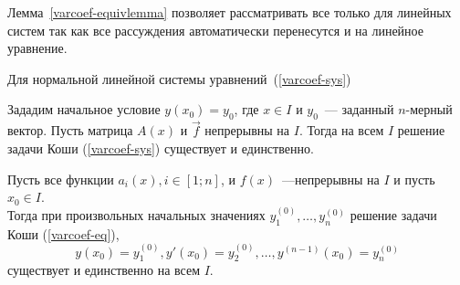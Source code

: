 Лемма~\ref{varcoef-equivlemma} позволяет рассматривать все только для линейных систем так как все рассуждения автоматически перенесутся и на линейное уравнение.

Для нормальной линейной системы уравнений~(\ref{varcoef-sys})

\begin{theorem}
Зададим начальное условие \(y(x_0) = y_0\), где \(x \in I\) и $y_0$~--- заданный $n$-мерный вектор. Пусть матрица $A(x)$ и $\vec{f}$ непрерывны на $I$. Тогда на всем $I$ решение задачи Коши (\ref{varcoef-sys}) существует и единственно.
\end{theorem}

\begin{theorem}
Пусть все функции \(a_i(x), i \in [1; n]\), и \(f(x)\)~---непрерывны на $I$ и пусть \(x_0 \in I\).\\
Тогда при произвольных начальных значениях \(y_1^{(0)}, \ldots, y_n^{(0)}\) решение задачи Коши (\ref{varcoef-eq}), 
\[y(x_0) = y_1^{(0)}, y'(x_0) = y_2^{(0)}, \ldots, y^{(n-1)}(x_0) = y_n^{(0)}\]
существует и единственно на всем $I$.
\end{theorem}
